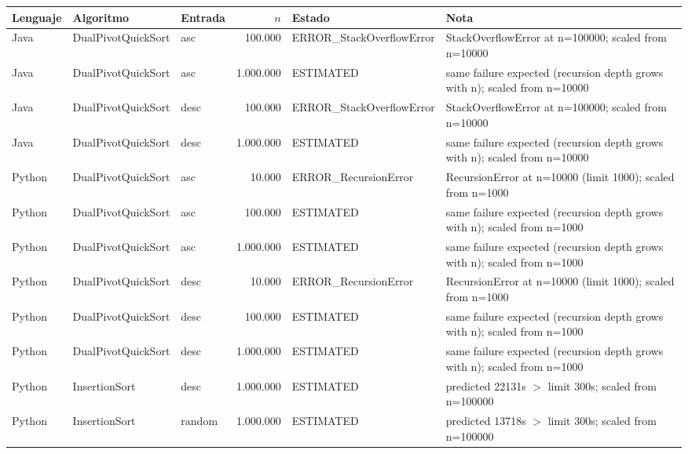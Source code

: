 {\tiny
\begin{tabular}{lllrlp{4.6cm}}
\toprule
Lenguaje & Algoritmo & Entrada & $n$ & Estado & Nota \\
\midrule
Java & DualPivotQuickSort & asc & 100.000 & ERROR\_StackOverflowError & StackOverflowError at n=100000; scaled from n=10000 \\
Java & DualPivotQuickSort & asc & 1.000.000 & ESTIMATED & same failure expected (recursion depth grows with n); scaled from n=10000 \\
Java & DualPivotQuickSort & desc & 100.000 & ERROR\_StackOverflowError & StackOverflowError at n=100000; scaled from n=10000 \\
Java & DualPivotQuickSort & desc & 1.000.000 & ESTIMATED & same failure expected (recursion depth grows with n); scaled from n=10000 \\
Python & DualPivotQuickSort & asc & 10.000 & ERROR\_RecursionError & RecursionError at n=10000 (limit 1000); scaled from n=1000 \\
Python & DualPivotQuickSort & asc & 100.000 & ESTIMATED & same failure expected (recursion depth grows with n); scaled from n=1000 \\
Python & DualPivotQuickSort & asc & 1.000.000 & ESTIMATED & same failure expected (recursion depth grows with n); scaled from n=1000 \\
Python & DualPivotQuickSort & desc & 10.000 & ERROR\_RecursionError & RecursionError at n=10000 (limit 1000); scaled from n=1000 \\
Python & DualPivotQuickSort & desc & 100.000 & ESTIMATED & same failure expected (recursion depth grows with n); scaled from n=1000 \\
Python & DualPivotQuickSort & desc & 1.000.000 & ESTIMATED & same failure expected (recursion depth grows with n); scaled from n=1000 \\
Python & InsertionSort & desc & 1.000.000 & ESTIMATED & predicted 22131s $>$ limit 300s; scaled from n=100000 \\
Python & InsertionSort & random & 1.000.000 & ESTIMATED & predicted 13718s $>$ limit 300s; scaled from n=100000 \\
\bottomrule
\end{tabular}}\par
